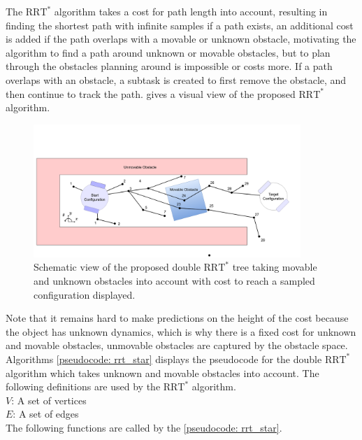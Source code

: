 The $\text{RRT}^*$ algorithm takes a cost for path length into account, resulting in finding the shortest path with infinite samples if a path exists, an additional cost is added if the path overlaps with a movable or unknown obstacle, motivating the algorithm to find a path around unknown or movable obstacles, but to plan through the obstacles planning around is impossible or costs more. If a path overlaps with an obstacle, a subtask is created to first remove the obstacle, and then continue to track the path.  gives a visual view of the proposed $\text{RRT}^*$ algorithm.\\

\begin{figure}[H]
    \centering
    \includegraphics[width=0.9\textwidth]{figures/rrt_with_costs.png}
    \caption{Schematic view of the proposed double $\text{RRT}^*$ tree taking movable and unknown obstacles into account with cost to reach a sampled configuration displayed.}
    \label{figure: double_rrt_alg}
\end{figure}

Note that it remains hard to make predictions on the height of the cost because the object has unknown dynamics, which is why there is a fixed cost for unknown and movable obstacles, unmovable obstacles are captured by the obstacle space. \\

Algorithms \cref{pseudocode: rrt_star} displays the pseudocode for the double $\text{RRT}^*$ algorithm which takes unknown and movable obstacles into account. The following definitions are used by the $\text{RRT}^*$ algorithm. \\

$V$: A set of vertices \\
\indent $E$: A set of edges\\

The following functions are called by the \cref{pseudocode: rrt_star}.\\ 


